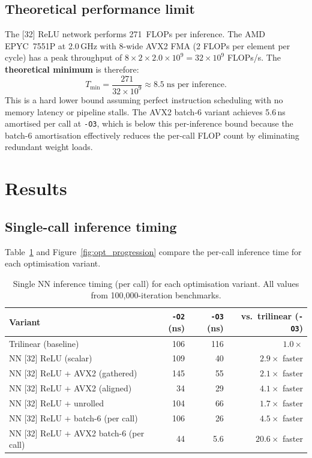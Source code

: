\documentclass[11pt,a4paper]{article}
\begin{document}
\subsection{Theoretical performance limit}
\label{sec:theoretical}

The [32] ReLU network performs 271~FLOPs per inference.  The
AMD EPYC~7551P at 2.0\,GHz with 8-wide AVX2 FMA (2 FLOPs per element
per cycle) has a peak throughput of $8 \times 2 \times 2.0 \times
10^9 = 32 \times 10^9$ FLOPs/s.  The \textbf{theoretical minimum} is
therefore:
\begin{equation}
    T_{\min} = \frac{271}{32 \times 10^9}
    \approx 8.5\;\text{ns per inference}.
    \label{eq:tmin}
\end{equation}
This is a hard lower bound assuming perfect instruction scheduling with
no memory latency or pipeline stalls.  The AVX2 batch-6 variant
achieves 5.6\,ns amortised per call at \texttt{-O3}, which is below
this per-inference bound because the batch-6 amortisation effectively
reduces the per-call FLOP count by eliminating redundant weight loads.


\section{Results}
\label{sec:results}

\subsection{Single-call inference timing}

Table~\ref{tab:inference} and Figure~\ref{fig:opt_progression} compare
the per-call inference time for each optimisation variant.

\begin{table}[htbp]
\centering
\caption{Single NN inference timing (per call) for each optimisation
variant.  All values from 100{,}000-iteration benchmarks.}
\label{tab:inference}
\begin{tabular}{lrrr}
\toprule
Variant & \texttt{-O2} (ns) & \texttt{-O3} (ns) & vs.\ trilinear
(\texttt{-O3}) \\
\midrule
Trilinear (baseline) & 106 & 116 & $1.0\times$ \\
NN [32] ReLU (scalar) & 109 & 40 & $2.9\times$ faster \\
NN [32] ReLU + AVX2 (gathered) & 145 & 55 & $2.1\times$ faster \\
NN [32] ReLU + AVX2 (aligned) & 34 & 29 & $4.1\times$ faster \\
NN [32] ReLU + unrolled & 104 & 66 & $1.7\times$ faster \\
NN [32] ReLU + batch-6 (per call) & 106 & 26 & $4.5\times$ faster \\
NN [32] ReLU + AVX2 batch-6 (per call) & 44 & 5.6 & $20.6\times$ faster \\
\bottomrule
\end{tabular}
\end{table}
\end{document}
